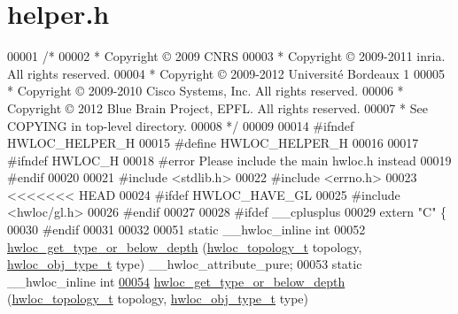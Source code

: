 \hypertarget{a00031_source}{
\section{helper.h}
}

\begin{DoxyCode}
00001 \textcolor{comment}{/*}
00002 \textcolor{comment}{ * Copyright © 2009 CNRS}
00003 \textcolor{comment}{ * Copyright © 2009-2011 inria.  All rights reserved.}
00004 \textcolor{comment}{ * Copyright © 2009-2012 Université Bordeaux 1}
00005 \textcolor{comment}{ * Copyright © 2009-2010 Cisco Systems, Inc.  All rights reserved.}
00006 \textcolor{comment}{ * Copyright © 2012 Blue Brain Project, EPFL. All rights reserved.}
00007 \textcolor{comment}{ * See COPYING in top-level directory.}
00008 \textcolor{comment}{ */}
00009 
00014 \textcolor{preprocessor}{#ifndef HWLOC\_HELPER\_H}
00015 \textcolor{preprocessor}{}\textcolor{preprocessor}{#define HWLOC\_HELPER\_H}
00016 \textcolor{preprocessor}{}
00017 \textcolor{preprocessor}{#ifndef HWLOC\_H}
00018 \textcolor{preprocessor}{}\textcolor{preprocessor}{#error Please include the main hwloc.h instead}
00019 \textcolor{preprocessor}{}\textcolor{preprocessor}{#endif}
00020 \textcolor{preprocessor}{}
00021 \textcolor{preprocessor}{#include <stdlib.h>}
00022 \textcolor{preprocessor}{#include <errno.h>}
00023 
<<<<<<< HEAD
00024 \textcolor{preprocessor}{#ifdef HWLOC\_HAVE\_GL}
00025 \textcolor{preprocessor}{}\textcolor{preprocessor}{#include <hwloc/gl.h>}
00026 \textcolor{preprocessor}{#endif}
00027 \textcolor{preprocessor}{}
00028 \textcolor{preprocessor}{#ifdef \_\_cplusplus}
00029 \textcolor{preprocessor}{}\textcolor{keyword}{extern} \textcolor{stringliteral}{"C"} \{
00030 \textcolor{preprocessor}{#endif}
00031 \textcolor{preprocessor}{}
00032 
00051 \textcolor{keyword}{static} \_\_hwloc\_inline \textcolor{keywordtype}{int}
00052 \hyperlink{a00052_ga081be77905201e9f42318e9974456b45}{hwloc_get_type_or_below_depth} (\hyperlink{a00039_ga9d1e76ee15a7dee158b786c30b6a6e38}{hwloc_topology_t} topology, \hyperlink{a00041_gacd37bb612667dc437d66bfb175a8dc55}{hwloc_obj_type_t} type) 
      \_\_hwloc\_attribute\_pure;
00053 \textcolor{keyword}{static} \_\_hwloc\_inline \textcolor{keywordtype}{int}
\hypertarget{a00031_source_l00054}{}\hyperlink{a00052_ga081be77905201e9f42318e9974456b45}{00054} \hyperlink{a00052_ga081be77905201e9f42318e9974456b45}{hwloc_get_type_or_below_depth} (\hyperlink{a00039_ga9d1e76ee15a7dee158b786c30b6a6e38}{hwloc_topology_t} topology, \hyperlink{a00041_gacd37bb612667dc437d66bfb175a8dc55}{hwloc_obj_type_t} type)

\end{DoxyCode}
